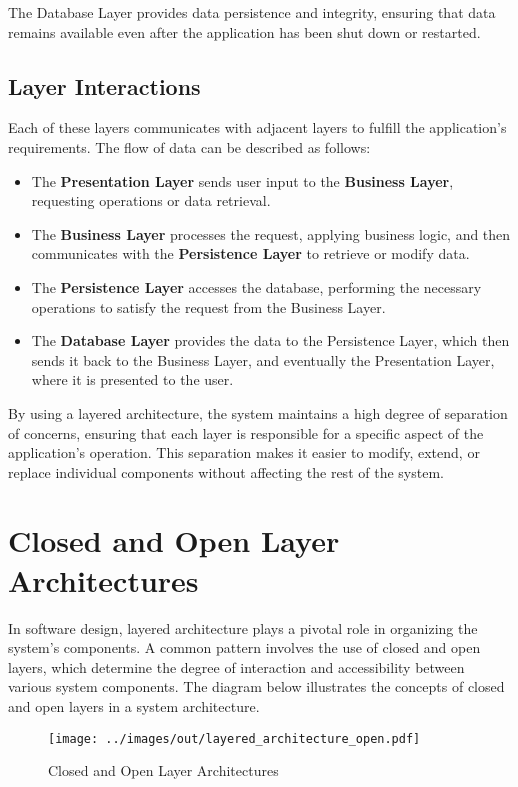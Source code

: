The Database Layer provides data persistence and integrity, ensuring that data remains available even after the application has been shut down or restarted.

\subsection{Layer Interactions}

Each of these layers communicates with adjacent layers to fulfill the application’s requirements. The flow of data can be described as follows:

\begin{itemize}
	\item The \textbf{Presentation Layer} sends user input to the \textbf{Business Layer}, requesting operations or data retrieval.
	\item The \textbf{Business Layer} processes the request, applying business logic, and then communicates with the \textbf{Persistence Layer} to retrieve or modify data.
	\item The \textbf{Persistence Layer} accesses the database, performing the necessary operations to satisfy the request from the Business Layer.
	\item The \textbf{Database Layer} provides the data to the Persistence Layer, which then sends it back to the Business Layer, and eventually the Presentation Layer, where it is presented to the user.
\end{itemize}

By using a layered architecture, the system maintains a high degree of separation of concerns, ensuring that each layer is responsible for a specific aspect of the application’s operation. This separation makes it easier to modify, extend, or replace individual components without affecting the rest of the system.

\section{Closed and Open Layer Architectures}

In software design, layered architecture plays a pivotal role in organizing the system's components. A common pattern involves the use of closed and open layers, which determine the degree of interaction and accessibility between various system components. The diagram below illustrates the concepts of closed and open layers in a system architecture.

\begin{figure}[ht]
	\centering
	\texttt{[image: ../images/out/layered\_architecture\_open.pdf]}
	\caption{Closed and Open Layer Architectures}
	\label{fig:layered_architecture_open}
\end{figure}


